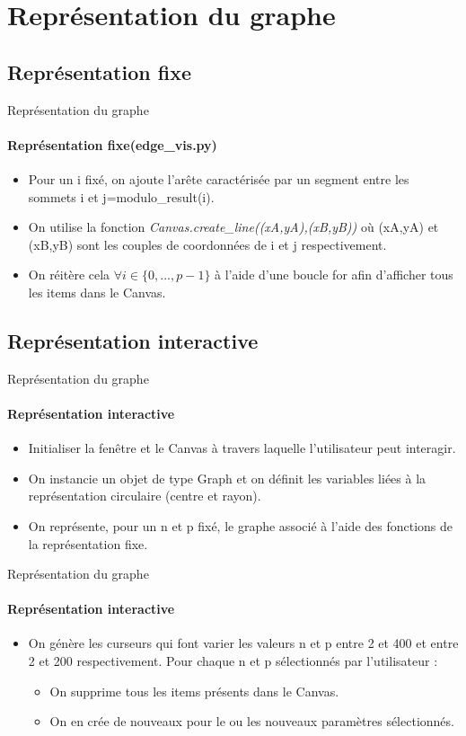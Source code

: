 \documentclass{beamer}
\begin{document}
\section{Représentation du graphe}
\subsection{Représentation fixe}
\begin{frame}{Représentation du graphe}
\framesubtitle{Représentation fixe(edge\_vis.py)}
\begin{itemize}
\item Pour un i fixé, on ajoute l'arête caractérisée par un segment entre les sommets i et j=modulo\_result(i).
\item On utilise la fonction \textit{Canvas.create\_line((xA,yA),(xB,yB))} où (xA,yA) et (xB,yB) sont les couples de coordonnées de i et j respectivement.
\item On réitère cela $\forall i \in \{0,...,p-1\}$ à l'aide d'une boucle for afin d'afficher tous les items dans le Canvas.
\end{itemize} 
\end{frame}

\subsection{Représentation interactive}
\begin{frame}{Représentation du graphe}
\framesubtitle{Représentation interactive}
\begin{itemize} 
\item Initialiser la fenêtre et le Canvas à travers laquelle l'utilisateur peut interagir. 
\item On instancie un objet de type Graph et on définit les variables liées à la représentation circulaire (centre et rayon).
\item On représente, pour un n et p fixé, le graphe associé à l'aide des fonctions de la représentation fixe.
\end{itemize}
\end{frame}

\begin{frame}{Représentation du graphe}
\framesubtitle{Représentation interactive}
\begin{itemize} 
\item On génère les curseurs qui font varier les valeurs n et p entre 2 et 400 et entre 2 et 200 respectivement. Pour chaque n et p sélectionnés par l'utilisateur :
\begin{itemize}
\item On supprime tous les items présents dans le Canvas.
\item On en crée de nouveaux pour le ou les nouveaux paramètres sélectionnés.
\end{itemize}
\end{itemize}
\end{frame}
\end{document}

